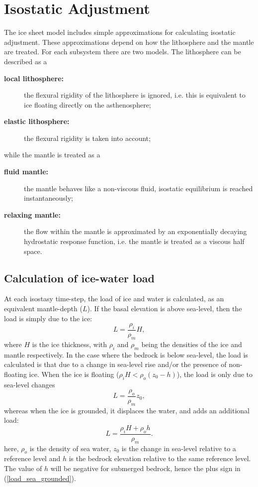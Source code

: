 \section{Isostatic Adjustment}
The ice sheet model includes simple approximations for calculating isostatic adjustment. These approximations depend on how the lithosphere and the mantle are treated. For each subsystem there are two models. The lithosphere can be described as a
\begin{description}
\item[\textbf{local lithosphere:}] the flexural rigidity of the lithosphere is ignored, i.e. this is equivalent to ice floating directly on the asthenosphere;
\item[\textbf{elastic lithosphere:}] the flexural rigidity is taken into account;
\end{description}
while the mantle is treated as a
\begin{description}
\item [\textbf{fluid mantle:}] the mantle behaves like a non-viscous fluid, isostatic equilibrium is reached instantaneously;
\item [\textbf{relaxing mantle:}] the flow within the mantle is approximated by an exponentially decaying hydrostatic response function, i.e. the mantle is treated as a viscous half space.
\end{description}

\subsection{Calculation of ice-water load}
At each isostasy time-step, the load of ice and water is calculated, as an
equivalent mantle-depth ($L$). If the basal elevation is above sea-level, then the
load is simply due to the ice:
\begin{equation}
L=\frac{\rho_i}{\rho_m}H,
\label{load_land_ice}
\end{equation}
where $H$ is the ice thickness, with $\rho_i$ and $\rho_m$ being the densities
of the ice and mantle respectively. In the case where the bedrock is below
sea-level, the load is calculated is that due to a change in sea-level rise and/or
the presence of non-floating ice. When the ice is floating ($\rho_i
H<\rho_o(z_0-h)$), the load is only due to sea-level changes
\begin{equation}
L=\frac{\rho_o}{\rho_m}z_0,
\label{load_sea_float}
\end{equation}
whereas when the ice is grounded, it displaces the water, and adds an
additional load:
\begin{equation}
L=\frac{\rho_i H+\rho_o h}{\rho_m}.
\label{load_sea_grounded}
\end{equation}
here, $\rho_o$ is the density of sea water, $z_0$ is the change in sea-level
relative to a reference level and $h$ is the bedrock elevation relative to the
same reference level. The value of $h$ will be negative for submerged bedrock,
hence the plus sign in (\ref{load_sea_grounded}).

